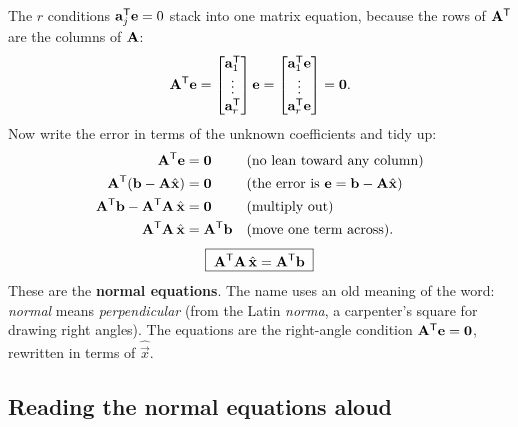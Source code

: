 The $r$ conditions $\mathbf{a}_j^{\mathsf{T}}\mathbf{e}=0$ stack into one matrix equation, because the rows of
$\mathbf{A}^{\mathsf{T}}$ are the columns of $\mathbf{A}$:
\[
  \mathbf{A}^{\mathsf{T}}\mathbf{e}
  = \begin{bmatrix} \mathbf{a}_1^{\mathsf{T}} \\ \vdots \\ \mathbf{a}_r^{\mathsf{T}} \end{bmatrix}\mathbf{e}
  = \begin{bmatrix} \mathbf{a}_1^{\mathsf{T}}\mathbf{e} \\ \vdots \\ \mathbf{a}_r^{\mathsf{T}}\mathbf{e} \end{bmatrix}
  = \mathbf{0}.
\]
Now write the error in terms of the unknown coefficients and tidy up:
\begin{align*}
  \mathbf{A}^{\mathsf{T}}\mathbf{e} &= \mathbf{0}
     && \text{(no lean toward any column)}\\
  \mathbf{A}^{\mathsf{T}}(\mathbf{b}-\mathbf{A}\hat{\mathbf{x}}) &= \mathbf{0}
     && \text{(the error is $\mathbf{e}=\mathbf{b}-\mathbf{A}\hat{\mathbf{x}}$)}\\
  \mathbf{A}^{\mathsf{T}}\mathbf{b}-\mathbf{A}^{\mathsf{T}}\mathbf{A}\,\hat{\mathbf{x}} &= \mathbf{0}
     && \text{(multiply out)}\\
  \mathbf{A}^{\mathsf{T}}\mathbf{A}\,\hat{\mathbf{x}} &= \mathbf{A}^{\mathsf{T}}\mathbf{b}
     && \text{(move one term across).}
\end{align*}
\begin{equation}\label{ch18:normal-eq}
  \boxed{\;\mathbf{A}^{\mathsf{T}}\mathbf{A}\,\hat{\mathbf{x}} = \mathbf{A}^{\mathsf{T}}\mathbf{b}\;}
\end{equation}
These are the \textbf{normal equations}. The name uses an old meaning of the word:
\emph{normal} means \emph{perpendicular} (from the Latin \emph{norma}, a carpenter's square for
drawing right angles). The equations are the right-angle condition $\mathbf{A}^{\mathsf{T}}\mathbf{e}=\mathbf{0}$,
rewritten in terms of $\hat{\vec{x}}$.

\subsection{Reading the normal equations aloud}

